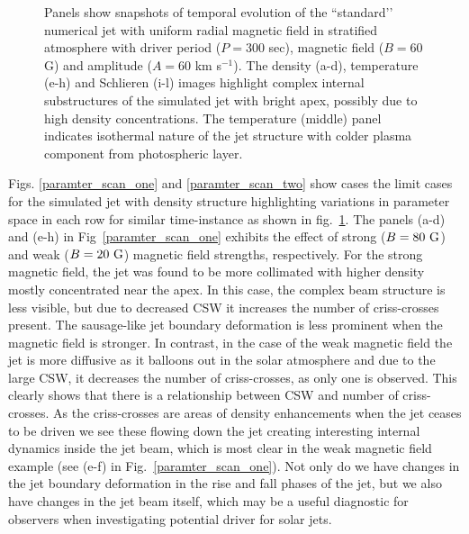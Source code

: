 \documentclass[12pt]{ociamthesis}
\newcommand{\np}{\\ \\}
\begin{document}
\begin{figure}
\captionsetup[subfigure]{labelformat=empty}
\centering
{}
\caption{Panels show snapshots of temporal evolution of the ``standard’’ numerical jet with uniform radial magnetic field in stratified atmosphere with driver period ($P = 300$ sec), magnetic field ($B = 60$ G) and amplitude ($A = 60$ km s$^{-1}$). The density (a-d), temperature (e-h) and Schlieren (i-l) images highlight complex internal substructures of the simulated jet with bright apex, possibly due to high density concentrations. The temperature (middle) panel indicates isothermal nature of the jet structure with colder plasma component from photospheric layer.}
\label{standard_jet}
\end{figure}
%
Figs. \ref{paramter_scan_one} and \ref{paramter_scan_two} show cases the limit cases for the simulated jet with density structure highlighting variations in parameter space in each row for similar time-instance as shown in fig.~\ref{standard_jet}. The panels (a-d) and (e-h) in Fig~\ref{paramter_scan_one} exhibits the effect of strong ($B = 80~\rm{G}$) and weak ($B = 20~\rm{G}$) magnetic field strengths, respectively. For the strong magnetic field, the jet was found to be more collimated with higher density mostly concentrated near the apex. In this case, the complex beam structure is less visible, but due to decreased CSW it increases the number of criss-crosses present. The sausage-like jet boundary deformation is less prominent when the magnetic field is stronger. In contrast, in the case of the weak magnetic field the jet is more diffusive as it balloons out in the solar atmosphere and due to the large CSW, it decreases the number of criss-crosses, as only one is observed. This clearly shows that there is a relationship between CSW and number of criss-crosses. As the criss-crosses are areas of density enhancements when the jet ceases to be driven we see these flowing down the jet creating interesting internal dynamics inside the jet beam, which is most clear in the weak magnetic field example (see (e-f) in Fig.~\ref{paramter_scan_one}). Not only do we have changes in the jet boundary deformation in the rise and fall phases of the jet, but we also have changes in the jet beam itself, which may be a useful diagnostic for observers when investigating potential driver for solar jets. \np     
%
\end{document}
